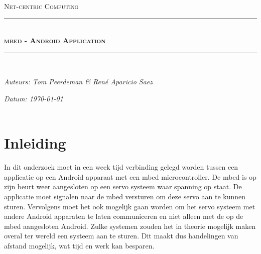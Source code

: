 \documentclass[a4paper]{article}
\newcommand{\HRule}{\rule{\linewidth}{0.5mm}}
\begin{document}
	\begin{titlepage}
	\begin{center}
		\textsc{\Large Net-centric Computing}\\[0.5cm]
		\HRule \\[0,4cm]
		\textsc{\huge \bfseries mbed - Android Application}
		\HRule \\[8cm]
		\begin{minipage}{0.4\textwidth}
			\begin{flushleft}\large
				\emph{Auteurs: Tom Peerdeman \& Ren\'e Aparicio Saez}\\
			\end{flushleft}
		\end{minipage}
		\begin{minipage}{0.4\textwidth}
			\begin{flushright}\large
			\emph{Datum: \today\\\hspace{1cm}}\\
			\end{flushright}
		\end{minipage}
	\end{center}
	\end{titlepage}

	\section{Inleiding}
		In dit onderzoek moet in een week tijd verbinding gelegd worden tussen een applicatie op een Android apparaat met een mbed microcontroller. De mbed is op zijn beurt weer aangesloten op een servo systeem waar spanning op staat. De applicatie moet signalen naar de mbed versturen om deze servo aan te kunnen sturen. Vervolgens moet het ook mogelijk gaan worden om het servo systeem met andere Android apparaten te laten communiceren en niet alleen met de op de mbed aangesloten Android. Zulke systemen zouden het in theorie mogelijk maken overal ter wereld een systeem aan te sturen. Dit maakt dus handelingen van afstand mogelijk, wat tijd en werk kan besparen.
\end{document}
